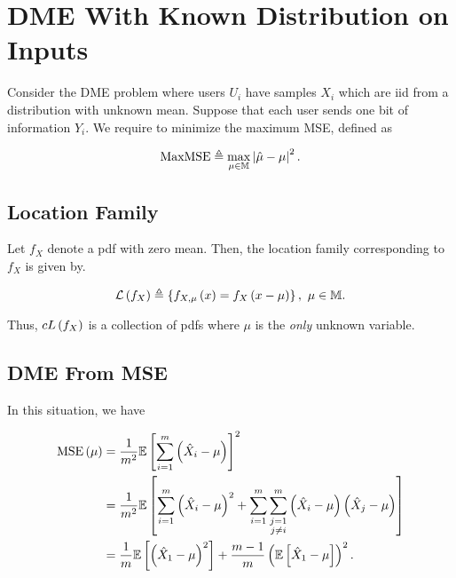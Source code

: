 \documentclass[twoside]{article}
\begin{document}



\section{DME With Known Distribution on Inputs}

Consider the DME problem where users \(U_i\) have samples \(X_i\) which are iid
from a distribution with unknown mean. Suppose that each user sends one bit of
information \(Y_i\). We require to minimize the maximum MSE, defined as

\begin{equation}
    \mathrm{MaxMSE} \triangleq \max_{\mu\in\mathbb M}\left\vert\hat{\mu}-\mu\right\vert^2.
    \label{eq:maxmse-def}
\end{equation}

\subsection{Location Family}

Let \(f_X\) denote a pdf with zero mean. Then, the location family 
corresponding to \(f_X\) is given by.

\begin{equation}
    \mathcal L\left(f_X\right) \triangleq \left\{f_{X,\mu}\left(x\right) = f_X\left(x-\mu\right)\right\},\ \mu \in \mathbb M.
    \label{eq:loc-fam-def}
\end{equation}

Thus, \(cL\left(f_X\right)\) is a collection of pdfs where \(\mu\) is the \emph{only} 
unknown variable.

\subsection{DME From MSE}

In this situation, we have

\begin{align}
    \mathrm{MSE}\left(\mu\right) &= \frac{1}{m^2}\mathbb{E}\left[ \sum_{i=1}^m\left(\hat{X}_i-\mu\right) \right]^2 \\
                   &= \frac{1}{m^2}\mathbb{E}\left[ \sum_{i=1}^m\left(\hat{X}_i-\mu\right)^2 + \sum_{i=1}^m\sum_{\substack{j=1\\j\neq i}}^m\left(\hat{X}_i-\mu\right)\left(\hat{X}_j-\mu\right) \right] \\
                   &= \frac{1}{m}\mathbb{E}\left[ \left(\hat{X}_1-\mu\right)^2 \right] + \frac{m-1}{m}\left(\mathbb{E}\left[ \hat{X}_1-\mu \right]\right)^2.
                   \label{eq:mse-mu}
\end{align}
\end{document}
